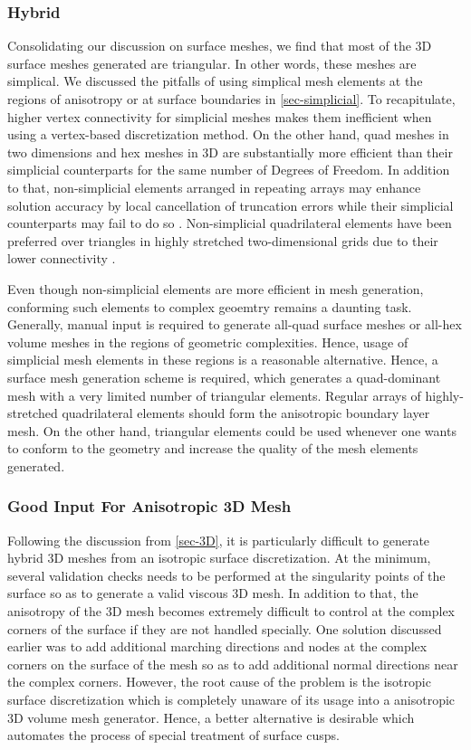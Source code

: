 \subsubsection{Hybrid}
Consolidating our discussion on surface meshes, we find that most of the 3D surface meshes generated are triangular. In other words, these meshes are simplical. We discussed the pitfalls of using simplical mesh elements at the regions of anisotropy or at surface boundaries in \ref{sec-simplicial}. To recapitulate, higher vertex connectivity for simplicial meshes makes them inefficient when using a vertex-based discretization method. On the other hand, quad meshes in two dimensions and hex meshes in 3D are substantially more efficient than their simplicial counterparts for the same number of Degrees of Freedom. In addition to that, non-simplicial elements arranged in repeating arrays may enhance solution accuracy by local cancellation of truncation errors while their simplicial counterparts may fail to do so \cite{mavriplis1997unstructured}. Non-simplicial quadrilateral elements have been preferred over triangles in highly stretched two-dimensional grids due to their lower connectivity \cite{aftosmis1994accuracy}.

Even though non-simplicial elements are more efficient in mesh generation, conforming such elements to complex geoemtry remains a daunting task. Generally, manual input is required to generate all-quad surface meshes or all-hex volume meshes in the regions of geometric complexities. Hence, usage of simplicial mesh elements in these regions is a reasonable alternative. Hence, a surface mesh generation scheme is required, which generates a quad-dominant mesh with a very limited number of triangular elements. Regular arrays of highly-stretched quadrilateral elements should form the anisotropic boundary layer mesh. On the other hand, triangular elements could be used whenever one wants to conform to the geometry and increase the quality of the mesh elements generated.

\subsubsection{Good Input For Anisotropic 3D Mesh}
Following the discussion from \ref{sec-3D}, it is particularly difficult to generate  hybrid 3D meshes from an isotropic surface discretization. At the minimum, several validation checks needs to be performed at the singularity points of the surface so as to generate a valid viscous 3D mesh. In addition to that, the anisotropy of the 3D mesh becomes extremely difficult to control at the complex corners of the surface if they are not handled specially. One solution discussed earlier was to add additional marching directions and nodes at the complex corners on the surface of the mesh so as to add additional normal directions near the complex corners. However, the root cause of the problem is the isotropic surface discretization which is completely unaware of its usage into a anisotropic 3D volume mesh generator. Hence, a better alternative is desirable which automates the process of special treatment of surface cusps.

